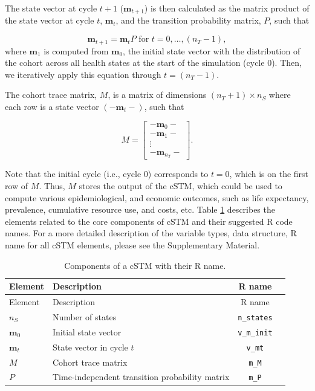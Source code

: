 \documentclass[
]{article}
\begin{document}
The state vector at cycle \(t+1\) (\(\mathbf{m}_{t+1}\)) is then calculated as the matrix product of the state vector at cycle \(t\), \(\mathbf{m}_{t}\), and the transition probability matrix, \(P\), such that

\[
  \mathbf{m}_{t+1} = \mathbf{m}_{t} P \text{ for } t = 0,\ldots, (n_T - 1),
\]
where \(\mathbf{m}_1\) is computed from \(\mathbf{m}_{0}\), the initial state vector with the distribution of the cohort across all health states at the start of the simulation (cycle 0). Then, we iteratively apply this equation through \(t = \left(n_T-1 \right)\).

The cohort trace matrix, \(M\), is a matrix of dimensions \((n_T+1) \times n_S\) where each row is a state vector \((-\mathbf{m}_{t}-)\), such that

\[
  M = 
  \begin{bmatrix}
    - \mathbf{m}_0 -  \\
    - \mathbf{m}_1 -  \\
     \vdots \\
    - \mathbf{m}_{n_T} -  
  \end{bmatrix}. 
\]

Note that the initial cycle (i.e., cycle 0) corresponds to \(t=0\), which is on the first row of \(M\). Thus, \(M\) stores the output of the cSTM, which could be used to compute various epidemiological, and economic outcomes, such as life expectancy, prevalence, cumulative resource use, and costs, etc. Table \ref{tab:cSTM-components-table} describes the elements related to the core components of cSTM and their suggested R code names. For a more detailed description of the variable types, data structure, R name for all cSTM elements, please see the Supplementary Material.

\begin{longtable}[]{@{}llcl@{}}
\caption{\label{tab:cSTM-components-table} Components of a cSTM with their R name.}\tabularnewline
\toprule
Element & Description & R name & \\
\midrule
\endfirsthead
\toprule
Element & Description & R name & \\
\midrule
\endhead
\(n_S\) & Number of states & \texttt{n\_states} & \\
\(\mathbf{m}_0\) & Initial state vector & \texttt{v\_m\_init} & \\
\(\mathbf{m}_t\) & State vector in cycle \(t\) & \texttt{v\_mt} & \\
\(M\) & Cohort trace matrix & \texttt{m\_M} & \\
\(P\) & Time-independent transition probability matrix & \texttt{m\_P} & \\
\bottomrule
\end{longtable}
\end{document}
